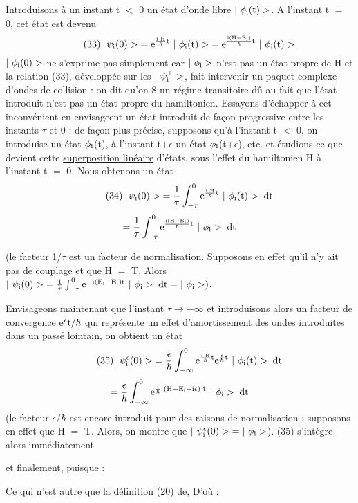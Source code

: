 Introduisons à un instant t $<$ 0 un état d'onde libre 
$|\ \phi_\mt{i}(\mt{t})>$. A l'instant t $=$ 0, cet état est devenu
\[
\tag{33}|\ \psi_\mt{i}(0)>\;=\mt{e}^{\frac{\mt{i H}}{\hbar}\mt{t}}\ |\ \phi_\mt{i}(\mt{t})>\;=
\mt{e}^{\frac{\mt{i(H}-\mt{E}_\mt{i})}{\hbar}\mt{t}}\ |\ \phi_\mt{i}(\mt{t})>
\]
$|\ \phi_\mt{i}(0)>$ ne s'exprime pas simplement car $|\ \phi_{\text{i}}>$ n'est pas un état propre
de H et la relation (33), développée sur les $|\ \psi_{\text{i}}^\pm>$, fait intervenir un
paquet complexe d'ondes de collision : on dit qu'on 8 un régime transitoire
dû au fait que l'état introduit n'est pas un état propre du hamiltonien.
Essayons d'échapper à cet inconvénient en envisageent un état introduit
de façon progressive entre les instants $\tau$ et 0 : de façon plus précise,
supposons qu'à l'instant t $<$ 0, on introduise un état $\phi_{\text{i}}$(t), à l'instant
t$+\epsilon$ un état $\phi_{\text{i}}$(t$+\epsilon$), etc. et étudions ce que devient cette
\ul{superposition linéaire} d'états, sous l'effet du hamiltonien H à l'instant t $=$ 0.
Nous obtenons un état
\[
\tag{34}|\ \psi_\mt{i}(0)>\;=\frac{1}{\tau}\int_{-\tau}^0\mt{e}^{\frac{\mt{i H}}{\hbar}\mt{t}}\ |\ \phi_\mt{i}(\mt{t})>\;\mt{dt}
\]
\[
=\frac{1}{\tau}\int_{-\tau}^0
\mt{e}^{\frac{\mt{i(H}-\mt{E}_\mt{i})}{\hbar}\mt{t}}\ |\ \phi_\mt{i}>\;\mt{dt}
\]

(le facteur 1/$\tau$ est un facteur de normalisation. Supposons en effet qu'il
n'y ait pas de couplage et que H $=$ T. Alors
$|\ \psi_\mt{i}(0)>\;=\frac{1}{\tau}\int_{-\tau}^0\mt{e}^{-\mt{i}(\mt{E}_\mt{i}-\mt{E}_\mt{i})\mt{t}}\ |\ \phi_\mt{i}>\;\mt{dt}=|\ \phi_\mt{i}>)$.

Envisageons maintenant que l'instant $\tau\to-\infty$ et introduisons alors un facteur de convergence
e$^\epsilon\text{t}/\hbar$ qui représente un effet d'amortissement des ondes
introduites dans un passé lointain, on obtient un état
\[
\tag{35}|\ \psi_\mt{i}^{\epsilon}(0)>\;=\frac{\epsilon}{\hbar}\int_{-\infty}^0\mt{e}^{\frac{\mt{i H}}{\hbar}\mt{t}}
\mt{e}^{\frac{\epsilon}{\hbar}\mt{t}}\ |\ \phi_\mt{i}(\mt{t})>\;\mt{dt}
\]
\[
=\frac{\epsilon}{\hbar}\int_{-\infty}^0
\text{e}^{\frac{\text{i}}{\hbar}\text{ (H}-\text{E}_{\text{i}}-\text{i}\epsilon)\text{ t}}\ |\ \phi_{\text{i}}>\;\text{dt}
\]
(le facteur $\epsilon/\hbar$ est encore introduit pour des raisons de normalisation :
supposons en effet que H $=$ T. Alors, on montre que $|\ \psi_\mt{i}^{\epsilon}(0)>\;=|\ \phi_\mt{i}>$).
(35) s'intègre alors immédiatement

et finalement, puisque :

Ce qui n'est autre que la définition (20) de, D'où :

